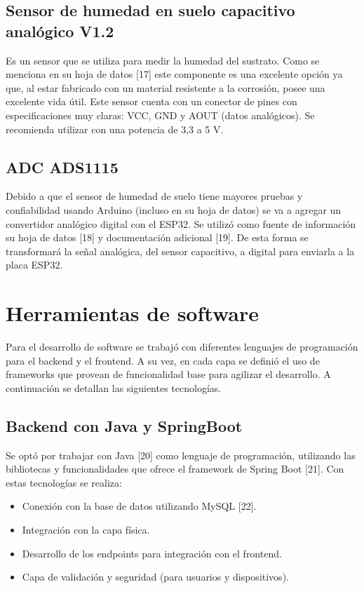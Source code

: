 \subsection{Sensor de humedad en suelo capacitivo analógico V1.2}
Es un sensor que se utiliza para medir la humedad del sustrato. Como se menciona en su hoja de datos [17] este componente es una excelente opción ya que, al estar fabricado con un material resistente a la corrosión, posee una excelente vida útil. Este sensor cuenta con un conector de pines con especificaciones muy claras: VCC, GND y AOUT (datos analógicos). Se recomienda utilizar con una potencia de 3,3 a 5 V.

\subsection{ADC ADS1115}
Debido a que el sensor de humedad de suelo tiene mayores pruebas y confiabilidad usando Arduino (incluso en su hoja de datos) se va a agregar un convertidor analógico digital con el ESP32. Se utilizó como fuente de información su hoja de datos [18] y documentación adicional [19]. De esta forma se transformará la señal analógica, del sensor capacitivo, a digital para enviarla a la placa ESP32.


\section{Herramientas de software}

Para el desarrollo de software se trabajó con diferentes lenguajes de programación para el backend y el frontend. A su vez, en cada capa se definió el uso de frameworks que provean de funcionalidad base para agilizar el desarrollo. A continuación se detallan  las siguientes tecnologías.

\subsection{Backend con Java y SpringBoot}
Se optó por trabajar con Java [20] como lenguaje de programación, utilizando las bibliotecas y funcionalidades que ofrece el framework de Spring Boot [21]. Con estas tecnologías se realiza:
\begin{itemize}
\item Conexión con la base de datos utilizando MySQL [22].
\item Integración con la capa física.
\item Desarrollo de los endpoints para integración con el frontend.
\item Capa de validación y seguridad (para usuarios y dispositivos).
\end{itemize}

